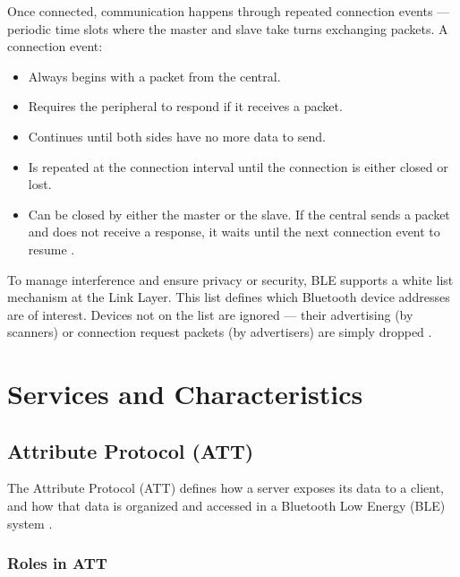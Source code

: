 Once connected, communication happens through repeated connection events — periodic time slots where the master and slave take turns exchanging packets. A connection event:
\begin{itemize}
    \item Always begins with a packet from the central.
    \item Requires the peripheral to respond if it receives a packet.
    \item Continues until both sides have no more data to send.
    \item Is repeated at the connection interval until the connection is either closed or lost.
    \item Can be closed by either the master or the slave. If the central sends a packet and does not receive a response, it waits until the next connection event to resume \cite{introtoble}.
\end{itemize}

To manage interference and ensure privacy or security, BLE supports a white list mechanism at the Link Layer. This list defines which Bluetooth device addresses are of interest. Devices not on the list are ignored — their advertising (by scanners) or connection request packets (by advertisers) are simply dropped \cite{gettingstartedwble}.

\section{Services and Characteristics}

\subsection{Attribute Protocol (ATT)}

The Attribute Protocol (ATT) defines how a server exposes its data to a client, and how that data is organized and accessed in a Bluetooth Low Energy (BLE) system \cite{introtoble}.

\subsubsection{Roles in ATT}


